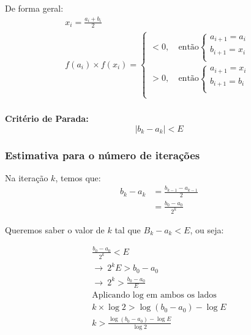 \documentclass[a4paper,oneside,article,table]{article}
\begin{document}
        De forma geral:
        \begin{gather*}
            x_i = \frac{a_i + b_i}{2}\\
            f(a_i) \times f(x_i) =
                \begin{cases}
                    < 0,~ & \text{então}
                        \begin{cases}
                            a_{i+1} = a_i\\
                            b_{i+1} = x_i\\
                        \end{cases}\\
                    > 0,~ & \text{então}
                        \begin{cases}
                            a_{i+1} = x_i\\
                            b_{i+1} = b_i\\
                        \end{cases}\\
                \end{cases}\\
        \end{gather*}

        \textbf{Critério de Parada:}
        \[|b_k - a_k| < E\]

        \subsubsection*{Estimativa para o número de iterações}
        Na iteração $k$, temos que:
        \begin{align*}
            b_k - a_k &= \frac{b_{k-1} - a_{k-1}}{2}\\
            &= \frac{b_0 - a_0}{2^k}
        \end{align*}

        Queremos saber o valor de $k$ tal que $B_k - a_k < E$, ou seja:

        \begin{gather*}
            \frac{b_0 - a_0}{2^k} < E\\
            \rightarrow~2^k E > b_0 - a_0\\
            \rightarrow~2^k > \frac{b_0 - a_0}{E}\\
            \text{Aplicando log em ambos os lados}\\
            k \times \log{2} > \log{(b_0 - a_0)} - \log{E}\\
            \boxed{k > \frac{\log{(b_0 - a_0)} - \log{E}}{\log{2}}}
        \end{gather*}
\end{document}
